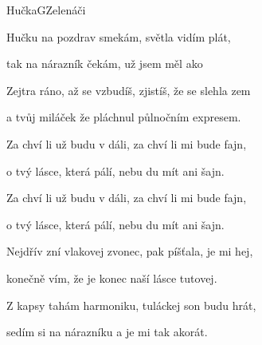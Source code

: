 \begin{song}{Hučka}{G}{Zelenáči}
\begin{SBVerse}
Hučku  na pozdrav smekám, světla  vidím plát,

tak na  nárazník čekám, už jsem  měl ako

Zejtra ráno, až se vzbudíš, zjistíš, že se slehla zem

a tvůj miláček že pláchnul půlnočním expresem.
\end{SBVerse}
\begin{SBChorus}
Za chví li už budu v dáli, za chví li mi bude fajn,

o tvý  lásce, která pálí, nebu du mít ani  šajn.

Za chví li už budu v dáli, za chví li mi bude fajn,

o tvý  lásce, která pálí, nebu du mít ani  šajn.
\end{SBChorus}
\begin{SBVerse}
Nejdřív zní vlakovej zvonec, pak píšťala, je mi hej,

konečně vím, že je konec naší lásce tutovej.

Z kapsy tahám harmoniku, tuláckej son budu hrát,

sedím si na nárazníku a je mi tak akorát. 
\end{SBVerse}
\end{song}
